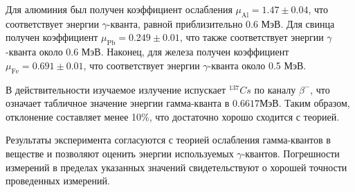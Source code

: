 Для алюминия был получен коэффициент ослабления $\mu_{\text{Al}} = 1.47 \pm 0.04$, что соответствует энергии $\gamma$-кванта, равной приблизительно 0.6 МэВ. Для свинца получен коэффициент $\mu_{\text{Pb}} = 0.249 \pm 0.01$, что также соответствует энергии $\gamma$-кванта около 0.6 МэВ. Наконец, для железа получен коэффициент $\mu_{\text{Fe}} = 0.691 \pm 0.01$, что соответствует энергии $\gamma$-кванта около 0.5 МэВ.

В действительности изучаемое излучение испускает $^{137}Cs$ по каналу $\beta^{-}$, что означает табличное значение энергии гамма-кванта в $0.6617МэВ$. Таким образом, отклонение составляет менее 10\%, что достаточно хорошо сходится с теорией.  

Результаты эксперимента согласуются с теорией ослабления гамма-квантов в веществе и позволяют оценить энергии используемых $\gamma$-квантов. Погрешности измерений в пределах указанных значений свидетельствуют о хорошей точности проведенных измерений.